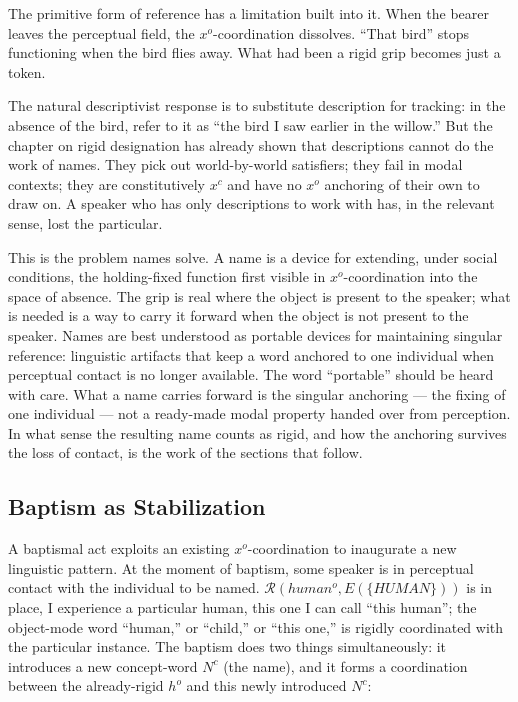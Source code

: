 \documentclass[12pt,a4paper]{article}
\begin{document}
The primitive form of reference has a limitation built into it. When the bearer leaves the perceptual field, the \(x^o\)-coordination dissolves. ``That bird'' stops functioning when the bird flies away. What had been a rigid grip becomes just a token.

The natural descriptivist response is to substitute description for tracking: in the absence of the bird, refer to it as ``the bird I saw earlier in the willow.'' But the chapter on rigid designation has already shown that descriptions cannot do the work of names. They pick out world-by-world satisfiers; they fail in modal contexts; they are constitutively \(x^c\) and have no \(x^o\) anchoring of their own to draw on. A speaker who has only descriptions to work with has, in the relevant sense, lost the particular.

This is the problem names solve. A name is a device for extending, under social conditions, the holding-fixed function first visible in \(x^o\)-coordination into the space of absence. The grip is real where the object is present to the speaker; what is needed is a way to carry it forward when the object is not present to the speaker. Names are best understood as portable devices for maintaining singular reference: linguistic artifacts that keep a word anchored to one individual when perceptual contact is no longer available. The word ``portable'' should be heard with care. What a name carries forward is the singular anchoring --- the fixing of one individual --- not a ready-made modal property handed over from perception. In what sense the resulting name counts as rigid, and how the anchoring survives the loss of contact, is the work of the sections that follow.

\subsection{Baptism as Stabilization}\label{baptism-as-stabilization}

A baptismal act exploits an existing \(x^o\)-coordination to inaugurate a new linguistic pattern. At the moment of baptism, some speaker is in perceptual contact with the individual to be named. \(\mathcal{R}(human^o, E(\{HUMAN\}))\) is in place, I experience a particular human, this one I can call ``this human''; the object-mode word ``human,'' or ``child,'' or ``this one,'' is rigidly coordinated with the particular instance. The baptism does two things simultaneously: it introduces a new concept-word \(N^c\) (the name), and it forms a coordination between the already-rigid \(h^o\) and this newly introduced \(N^c\):
\end{document}

